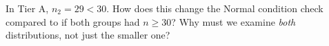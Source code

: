 \documentclass[10pt]{article}
\begin{document}
\begin{reflectionbox}
In Tier A, $n_2 = 29 < 30$. How does this change the Normal condition check compared to if
both groups had $n \ge 30$? Why must we examine \emph{both} distributions, not just the
smaller one?
\end{reflectionbox}
\end{document}
